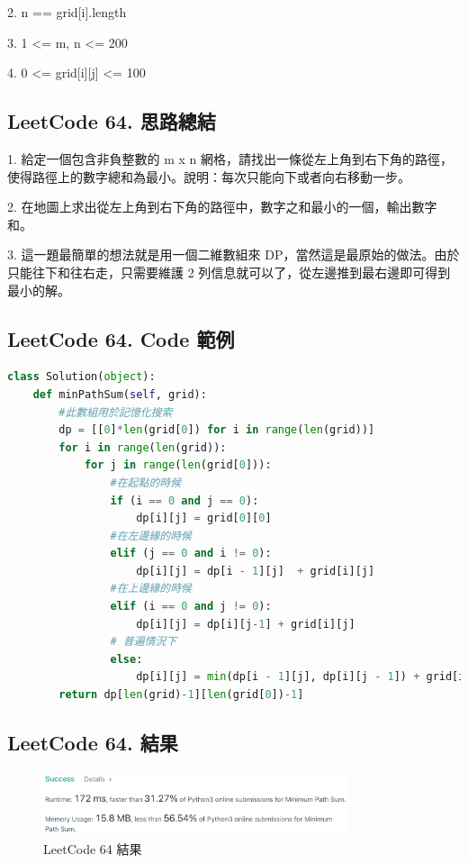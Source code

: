 \documentclass[10pt,UTF8]{ctexart}
\begin{document}
2. n == grid[i].length

3. 1 <= m, n <= 200

4. 0 <= grid[i][j] <= 100

\subsection{LeetCode 64. 思路總結}

1. 給定一個包含非負整數的 m x n 網格，請找出一條從左上角到右下角的路徑，使得路徑上的數字總和為最小。說明：每次只能向下或者向右移動一步。

2. 在地圖上求出從左上角到右下角的路徑中，數字之和最小的一個，輸出數字和。

3. 這一題最簡單的想法就是用一個二維數組來 DP，當然這是最原始的做法。由於只能往下和往右走，只需要維護 2 列信息就可以了，從左邊推到最右邊即可得到最小的解。

\subsection{LeetCode 64. Code 範例}

\begin{lstlisting}[language={python}]
class Solution(object):
    def minPathSum(self, grid):
        #此數組用於記憶化搜索
        dp = [[0]*len(grid[0]) for i in range(len(grid))]
        for i in range(len(grid)):
            for j in range(len(grid[0])):
                #在起點的時候
                if (i == 0 and j == 0):
                    dp[i][j] = grid[0][0]
                #在左邊緣的時候
                elif (j == 0 and i != 0):
                    dp[i][j] = dp[i - 1][j]  + grid[i][j]
                #在上邊緣的時候
                elif (i == 0 and j != 0):
                    dp[i][j] = dp[i][j-1] + grid[i][j]
                # 普遍情況下
                else:
                    dp[i][j] = min(dp[i - 1][j], dp[i][j - 1]) + grid[i][j]                    
        return dp[len(grid)-1][len(grid[0])-1]
\end{lstlisting}

\subsection{LeetCode 64. 結果}

\begin{figure}[H]
\centering 
\includegraphics[width=0.80\textwidth]{lc-64-o.png} 
\caption{LeetCode 64 結果}
\label{Test}
\end{figure}
\end{document}
